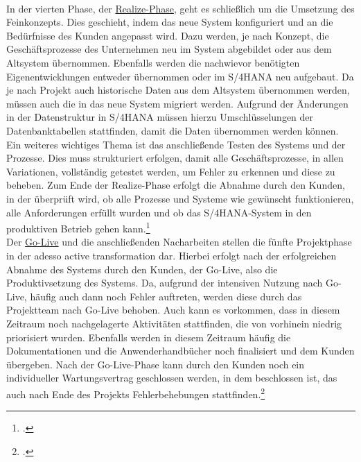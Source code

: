 \vspace{1em}
\\In der vierten Phase, der \underline{\glqq{}Realize\grqq{}-Phase}, geht es schließlich um die Umsetzung des Feinkonzepts. Dies geschieht, indem das neue System konfiguriert und an die Bedürfnisse des Kunden angepasst wird. Dazu werden, je nach Konzept, die Geschäftsprozesse des Unternehmen neu im System abgebildet oder aus dem Altsystem übernommen. Ebenfalls werden die nachwievor benötigten Eigenentwicklungen entweder übernommen oder im S/4HANA neu aufgebaut. Da je nach Projekt auch historische Daten aus dem Altsystem übernommen werden, müssen auch die in das neue System migriert werden. Aufgrund der Änderungen in der Datenstruktur in S/4HANA müssen hierzu Umschlüsselungen der Datenbanktabellen stattfinden, damit die Daten übernommen werden können. Ein weiteres wichtiges Thema ist das anschließende Testen des Systems und der Prozesse. Dies muss strukturiert erfolgen, damit alle Geschäftsprozesse, in allen Variationen, vollständig getestet werden, um Fehler zu erkennen und diese zu beheben. Zum Ende der Realize-Phase erfolgt die Abnahme durch den Kunden, in der überprüft wird, ob alle Prozesse und Systeme wie gewünscht funktionieren, alle Anforderungen erfüllt wurden und ob das S/4HANA-System in den produktiven Betrieb gehen kann.\footcite[Vgl.][]{aat-realize}\\
\vspace{1em}
Der \underline{\glqq{}Go-Live\grqq{}} und die anschließenden Nacharbeiten stellen die fünfte Projektphase in der adesso active transformation dar. Hierbei erfolgt nach der erfolgreichen Abnahme des Systems durch den Kunden, der Go-Live, also die Produktivsetzung des Systems. Da, aufgrund der intensiven Nutzung nach Go-Live, häufig auch dann noch Fehler auftreten, werden diese durch das Projektteam nach Go-Live behoben. Auch kann es vorkommen, dass in diesem Zeitraum noch nachgelagerte Aktivitäten stattfinden, die von vorhinein niedrig priorisiert wurden. Ebenfalls werden in diesem Zeitraum häufig die Dokumentationen und die Anwenderhandbücher noch finalisiert und dem Kunden übergeben. Nach der Go-Live-Phase kann durch den Kunden noch ein individueller Wartungsvertrag geschlossen werden, in dem beschlossen ist, das auch nach Ende des Projekts Fehlerbehebungen stattfinden.\footcite[Vgl.][]{aat-golive}


